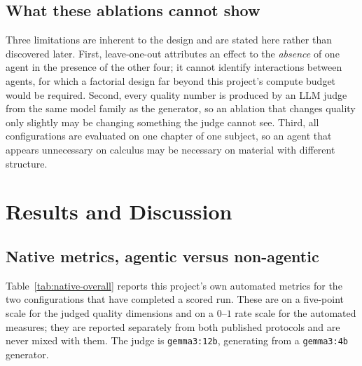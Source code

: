 \subsection{What these ablations cannot show}
\label{sec:res-ablation-limits}

Three limitations are inherent to the design and are stated here rather than
discovered later. First, leave-one-out attributes an effect to the
\emph{absence} of one agent in the presence of the other four; it cannot
identify interactions between agents, for which a factorial design far beyond
this project's compute budget would be required. Second, every quality number
is produced by an LLM judge from the same model family as the generator, so an
ablation that changes quality only slightly may be changing something the judge
cannot see. Third, all configurations are evaluated on one chapter of one
subject, so an agent that appears unnecessary on calculus may be necessary on
material with different structure.

\section{Results and Discussion}
\label{sec:res-results}

\subsection{Native metrics, agentic versus non-agentic}
\label{sec:res-native}

Table~\ref{tab:native-overall} reports this project's own automated metrics for
the two configurations that have completed a scored run. These are on a
five-point scale for the judged quality dimensions and on a $0$--$1$ rate scale
for the automated measures; they are reported separately from both published
protocols and are never mixed with them. The judge is \texttt{gemma3:12b},
generating from a \texttt{gemma3:4b} generator.

